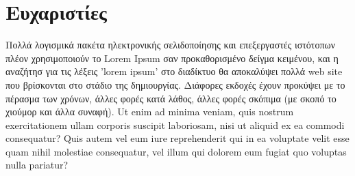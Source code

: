 \chapter*{Ευχαριστίες}
\label{chapter:acknowledgements}
    Πολλά λογισμικά πακέτα ηλεκτρονικής σελιδοποίησης και επεξεργαστές ιστότοπων πλέον χρησιμοποιούν το Lorem Ipsum σαν
    προκαθορισμένο δείγμα κειμένου, και η αναζήτησ για τις λέξεις 'lorem ipsum' στο διαδίκτυο θα αποκαλύψει πολλά web site
    που βρίσκονται στο στάδιο της δημιουργίας. Διάφορες εκδοχές έχουν προκύψει με το πέρασμα των χρόνων, άλλες φορές κατά
    λάθος, άλλες φορές σκόπιμα (με σκοπό το χιούμορ και άλλα συναφή). Ut enim ad minima veniam, quis
    nostrum exercitationem ullam corporis suscipit laboriosam, nisi ut aliquid ex ea commodi
    consequatur? Quis autem vel eum iure reprehenderit qui in ea voluptate velit esse quam nihil
    molestiae consequatur, vel illum qui dolorem eum fugiat quo voluptas nulla pariatur?
